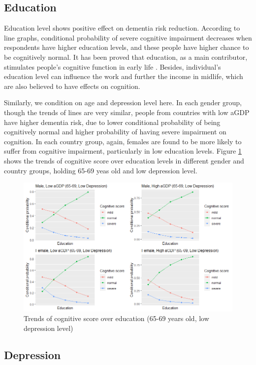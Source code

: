 \documentclass[11pt,twoside]{article}
\numberwithin{Theorem}{section}
\numberwithin{Definition}{section}
\numberwithin{Lemma}{section}
\numberwithin{Algorithm}{section}
\numberwithin{equation}{section}
\begin{document}
\subsection {Education}

Education level shows positive effect on dementia risk reduction. According to line graphs, conditional probability of severe cognitive impairment decreases when respondents have higher education levels, and these people have higher chance to be cognitively normal. It has been proved that education, as a main contributor, stimulates people's cognitive function in early life \cite{blacker2018brain}. Besides, individual's education level can influence the work and further the income in midlife, which are also believed to have effects on cognition.

Similarly, we condition on age and depression level here. In each gender group, though the trends of lines are very similar, people from countries with low aGDP have higher dementia risk, due to lower conditional probability of being cognitively normal and higher probability of having severe impairment on cognition. In each country group, again, females are found to be more likely to suffer from cognitive impairment, particularly in low education levels. Figure \ref{fig:edu1} shows the trends of cognitive score over education levels in different gender and country groups, holding 65-69 yeas old and low depression level.

\begin{figure}[!h]
	\centering
	\includegraphics[width = 0.85 \textwidth]{Images/edu1.png}
	\caption{Trends of cognitive score over education (65-69 years old, low depression level)}
	\label{fig:edu1}
\end{figure}

\subsection{Depression}
\end{document}
